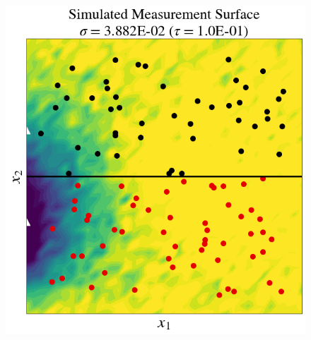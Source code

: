 \begin{frame}[t]
\begin{figure}[htbp]
\centering
    \includegraphics[width=0.5\linewidth]{figures/pde-highd/pde-highd_sensors_D2.png}
\label{fig:pde-Q}
\end{figure}
\end{frame}


